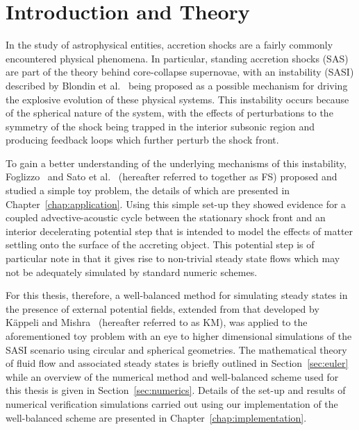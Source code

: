 \newcommand{\package}{\emph}

\chapter{Introduction and Theory}
\label{chap:introduction}

In the study of astrophysical entities, accretion shocks are a fairly commonly encountered physical phenomena. In particular, standing accretion shocks (SAS) are part of the theory behind core-collapse supernovae, with an instability (SASI) described by Blondin et al.~\cite{Blondin2003} being proposed as a possible mechanism for driving the explosive evolution of these physical systems. This instability occurs because of the spherical nature of the system, with the effects of perturbations to the symmetry of the shock being trapped in the interior subsonic region and producing feedback loops which further perturb the shock front.

To gain a better understanding of the underlying mechanisms of this instability, Foglizzo~\cite{Foglizzo2009} and Sato et al.~\cite{Sato2009} (hereafter referred to together as FS) proposed and studied a simple toy problem, the details of which are presented in Chapter~\ref{chap:application}. Using this simple set-up they showed evidence for a coupled advective-acoustic cycle between the stationary shock front and an interior decelerating potential step that is intended to model the effects of matter settling onto the surface of the accreting object. This potential step is of particular note in that it gives rise to non-trivial steady state flows which may not be adequately simulated by standard numeric schemes.

For this thesis, therefore, a well-balanced method for simulating steady states in the presence of external potential fields, extended from that developed by K\"appeli and Mishra~\cite{Kappeli2014} (hereafter referred to as KM), was applied to the aforementioned toy problem with an eye to higher dimensional simulations of the SASI scenario using circular and spherical geometries. The mathematical theory of fluid flow and associated steady states is briefly outlined in Section~\ref{sec:euler} while an overview of the numerical method and well-balanced scheme used for this thesis is given in Section~\ref{sec:numerics}. Details of the set-up and results of numerical verification simulations carried out using our implementation of the well-balanced scheme are presented in Chapter~\ref{chap:implementation}.


